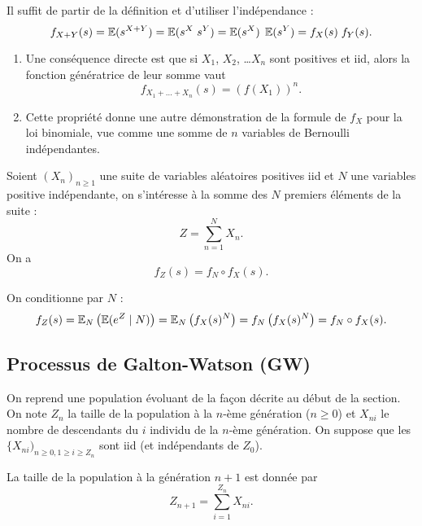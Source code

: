 \proof
Il suffit de partir de la définition et d'utiliser l'indépendance :
$$
f_{X+Y}(s) 
= \operatorname{\mathbb{E}}(s^{X+Y}) = \operatorname{\mathbb{E}}(s^X \; s^Y) = \operatorname{\mathbb{E}}(s^X) \;  \operatorname{\mathbb{E}}(s^Y)
= f_X(s) \; f_Y(s).
$$
\eproof

\remarks
\begin{enumerate}
  \item Une conséquence directe est que si $X_1$, $X_2$, \dots $X_n$ sont positives et iid, alors la fonction génératrice de leur somme vaut
  $$
  f_{X_1 + \dots + X_n}(s) = \left(f(X_1)\right)^n.
  $$
  \item Cette propriété donne une autre démonstration de la formule de $f_X$ pour la loi binomiale, vue comme une somme de $n$ variables de Bernoulli indépendantes.
\end{enumerate}

\begin{proposition} \label{prop:fGeneratriceSommeAleatoire}
  Soient $(X_n)_{n \geq 1}$ une suite de variables aléatoires positives iid et $N$ une variables positive indépendante, on s'intéresse à la somme des $N$ premiers éléments de la suite :
  $$
  Z = \sum_{n=1}^N X_n.
  $$
  On a 
  $$
  f_{Z}(s) = f_N \circ f_X(s).
  $$
\end{proposition}

\proof
On conditionne par $N$ :
\begin{align*}
  f_Z(s) 
  = \operatorname{\mathbb{E}}_N \left(\operatorname{\mathbb{E}}(e^Z \mid N) \right)
  = \operatorname{\mathbb{E}}_N \left(f_X(s)^N \right)
  = f_N \left(f_X(s)^N \right) = f_N \circ f_X(s).
\end{align*}

\eproof

\subsection{Processus de Galton-Watson (GW)} 

On reprend une population évoluant de la façon décrite au début de la section. 
On note $Z_n$ la taille de la population à la $n$-ème génération ($n \geq 0$) et $X_{ni}$ le nombre de descendants du $i$ individu de la $n$-ème génération. 
On suppose que les $\{X_{ni})_{n \geq 0, 1 \geq i \geq Z_n}$ sont iid (et indépendants de $Z_0$).

\bigskip
La taille de la population à la génération $n+1$ est donnée par 
\begin{equation} \label{eq:recurrenceGW}
Z_{n+1} = \sum_{i = 1}^{Z_n} X_{ni}.
\end{equation}

